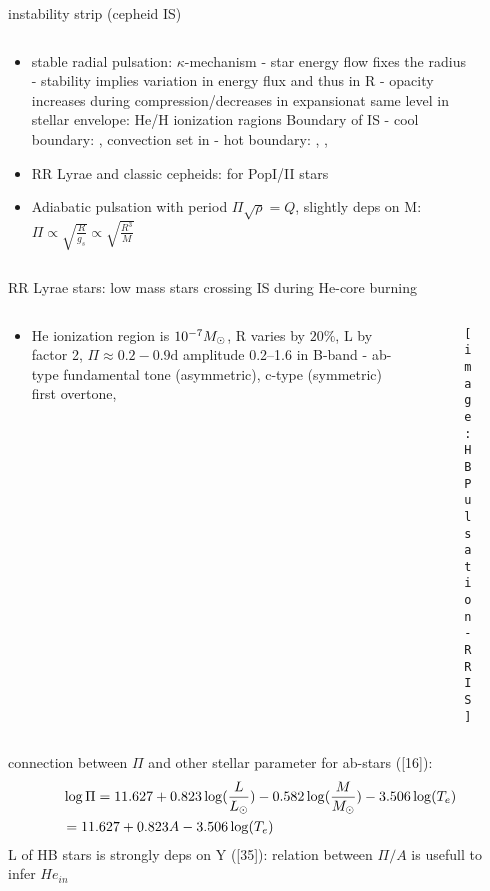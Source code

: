 \begin{frame}{instability strip (cepheid IS)}
\begin{columns}[T]
	\begin{column}{0.55\textwidth}
	\begin{itemize}
	\item stable radial pulsation: $\kappa$-mechanism - star energy flow fixes the radius - stability implies variation in energy flux and thus in R - opacity increases during compression/decreases in expansionat same level in stellar envelope: He/H ionization ragions
	Boundary of IS - cool boundary: , convection set in - hot boundary: , , 
	\item RR Lyrae and classic cepheids:  for PopI/II stars
	\item Adiabatic pulsation with period $\Pi\sqrt{\rho}=Q$, slightly deps on M: $\Pi\propto	\sqrt{\frac{R}{g_s}}\propto\sqrt{\frac{R^3}{M}}$ 
	\end{itemize}
	\end{column}
	\begin{column}{0.45\textwidth}
	\begin{figure}[!ht]
	\end{figure}
\end{column}\end{columns}
\end{frame}

\begin{frame}{RR Lyrae stars: low mass stars crossing IS during He-core burning}
\begin{columns}[T]
	\begin{column}{0.55\textwidth}
		\begin{itemize}
			\item He ionization region is $\num{e-7}M_{\odot}$, R varies by $20\%$, L by factor 2, $\Pi\approx0.2-0.9\si{\day}$ amplitude \SIrange{0.2}{1.6}{\mag} in B-band - ab-type fundamental tone (asymmetric), c-type (symmetric) first overtone,
		\end{itemize}
	\end{column}
	\begin{column}{0.45\textwidth}
	\begin{figure}[!ht]
	\texttt{[image: HBPulsation-RRIS]}\label{fig:HBPulsation-RRIS}
	\end{figure}
\end{column}\end{columns}
connection between $\Pi$ and other stellar parameter for ab-stars ([16]):
\begin{align*}
&\log{\Pi}=11.627+0.823\log(\frac{L}{L_{\odot}})-0.582\log(\frac{M}{M_{\odot}})-3.506\log(T_e)\\
&=11.627+0.823A-3.506\log(T_e)
\end{align*}
L of HB stars is strongly deps on Y ([35]): relation between $\Pi/A$ is usefull to infer $He_{in}$
\end{frame}

